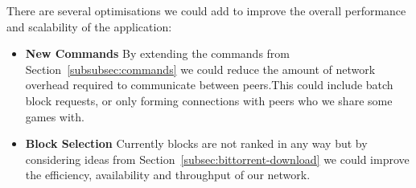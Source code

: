 There are several optimisations we could add to improve the overall performance and scalability of the application:

\begin{itemize}
  \item \textbf{New Commands} By extending the commands from Section~\ref{subsubsec:commands} we could reduce the amount of network overhead required to communicate between peers.\newline This could include batch block requests, or only forming connections with peers who we share some games with.
  \item \textbf{Block Selection} Currently blocks are not ranked in any way but by considering ideas from Section~\ref{subsec:bittorrent-download} we could improve the efficiency, availability and throughput of our network.
\end{itemize}
